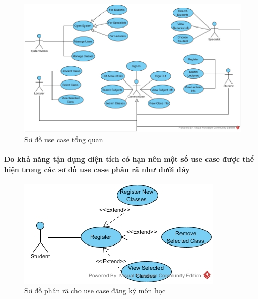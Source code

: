 \documentclass[12pt]{book}
\begin{document}
  \FloatBarrier
  \begin{figure}[ht]
    \centering
    \includegraphics[scale=0.4]{../pictures/projectdiagrams/uc.jpg}
    \caption{Sơ đồ use case tổng quan}
  \end{figure}
  \FloatBarrier

  \paragraph{
    \textnormal{Do khả năng tận dụng diện tích có hạn nên một số use case được thể hiện trong các sơ đồ use case phân rã như dưới đây}
  }

  \FloatBarrier
  \begin{figure}[ht]
    \centering
    \includegraphics[scale=0.5]{../pictures/projectdiagrams/Register-uc-destructing.jpg}
    \caption{Sơ đồ phân rã cho use case đăng ký môn học}
  \end{figure}
  \FloatBarrier
\end{document}
